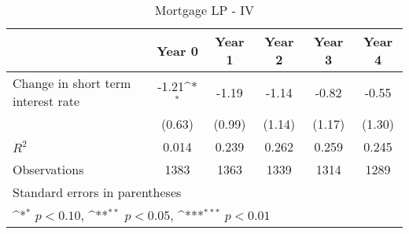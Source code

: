 \documentclass{article}
\begin{document}
\begin{table}[htbp]\centering
\def\sym#1{\ifmmode^{#1}\else\(^{#1}\)\fi}
\caption{Mortgage LP - IV}
\begin{tabular}{l*{5}{c}}
\hline\hline
                    &\multicolumn{1}{c}{Year 0}&\multicolumn{1}{c}{Year 1}&\multicolumn{1}{c}{Year 2}&\multicolumn{1}{c}{Year 3}&\multicolumn{1}{c}{Year 4}\\
\hline
Change in short term interest rate&       -1.21\sym{*}  &       -1.19         &       -1.14         &       -0.82         &       -0.55         \\
                    &      (0.63)         &      (0.99)         &      (1.14)         &      (1.17)         &      (1.30)         \\
\hline
\(R^{2}\)           &       0.014         &       0.239         &       0.262         &       0.259         &       0.245         \\
Observations        &        1383         &        1363         &        1339         &        1314         &        1289         \\
\hline\hline
\multicolumn{6}{l}{\footnotesize Standard errors in parentheses}\\
\multicolumn{6}{l}{\footnotesize \sym{*} \(p<0.10\), \sym{**} \(p<0.05\), \sym{***} \(p<0.01\)}\\
\end{tabular}
\end{table}
\end{document}
